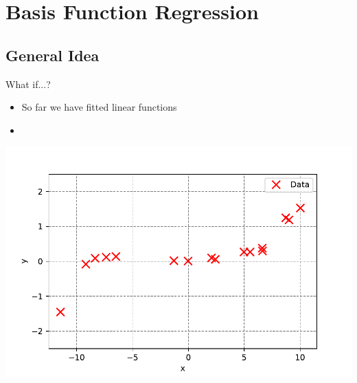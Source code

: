 \section{Basis Function Regression}

\subsection{General Idea}

\begin{frame}{What if...?}{}
	\begin{itemize}
		\item So far we have fitted linear functions
		\item {}
	\end{itemize}
	\includegraphics[scale=0.5]{05_regression/02_img/non_linear_data}
\end{frame}


